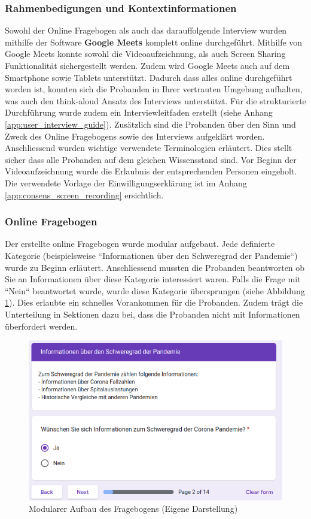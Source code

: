 \clearpage
\subsubsection{Rahmenbedigungen und Kontextinformationen}
Sowohl der Online Fragebogen als auch das darauffolgende Interview wurden mithilfe der Software \textbf{Google Meets} komplett online durchgeführt. Mithilfe von Google Meets konnte sowohl die Videoaufzeichnung, als auch Screen Sharing Funktionalität sichergestellt werden. Zudem wird Google Meets auch auf dem Smartphone sowie Tablets unterstützt. Dadurch dass alles online durchgeführt worden ist, konnten sich die Probanden in Ihrer vertrauten Umgebung aufhalten, was auch den think-aloud Ansatz des Interviews unterstützt. Für die strukturierte Durchführung wurde zudem ein Interviewleitfaden erstellt (siehe Anhang \ref{app:user_interview_guide}). Zusätzlich sind die Probanden über den Sinn und Zweck des Online Fragebogens sowie des Interviews aufgeklärt worden. Anschliessend wurden wichtige verwendete Terminologien erläutert. Dies stellt sicher dass alle Probanden auf dem gleichen Wissensstand sind. Vor Beginn der Videoaufzeichnung wurde die Erlaubnis der entsprechenden Personen eingeholt. Die verwendete Vorlage der Einwilligungserklärung ist im Anhang \ref{app:consens_screen_recording} ersichtlich.

\subsubsection{Online Fragebogen}
Der erstellte online Fragebogen wurde modular aufgebaut. Jede definierte Kategorie (beispielsweise ``Informationen über den Schweregrad der Pandemie``) wurde zu Beginn erläutert. Anschliessend mussten die Probanden beantworten ob Sie an Informationen über diese Kategorie interessiert waren. Falls die Frage mit ``Nein`` beantwortet wurde, wurde diese Kategorie übersprungen (siehe Abbildung \ref{fig:online_formular_sections}). Dies erlaubte ein schnelles Vorankommen für die Probanden. Zudem trägt die Unterteilung in Sektionen dazu bei, dass die Probanden nicht mit Informationen überfordert werden.

\begin{figure}[h]
    \includegraphics[width=12cm]{images/online_formular_sections.png}
    \centering
    \caption{Modularer Aufbau des Fragebogens (Eigene Darstellung)}
    \label{fig:online_formular_sections}
\end{figure}

